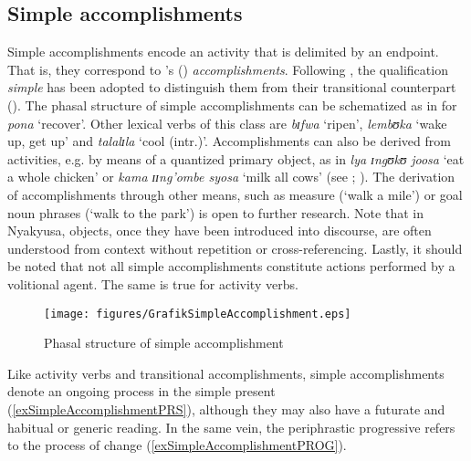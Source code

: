 \subsection{Simple accomplishments}\label{VerbalClassSimpleAccomplishment}
Simple accomplishments encode an activity that is delimited by an endpoint. That is, they correspond to \citeauthor{VendlerZ1957}'s (\citeyear{VendlerZ1957}) \textit{accomplishments}. Following \citet{BotneR2008}, the qualification \textit{simple} has been adopted to distinguish them from their transitional counterpart (). The phasal structure of simple accomplishments can be schematized as in  for \textit{pona} \lq recover'. Other lexical verbs of this class are \textit{bɪfwa} \lq ripen', \textit{lembʊka} \lq wake up, get up' and \textit{talalɪla} \lq cool (intr.)'. Accomplishments can also be derived from activities, e.g. by means of a quantized primary object, as in \textit{lya ɪngʊkʊ joosa} \lq eat a whole chicken' or \textit{kama ɪɪng'ombe syosa} \lq milk all cows' (see \citealt{VerkuylH1972}; \citealt{DowtyD1979}). The derivation of accomplishments through other means, such as measure (\lq walk a mile') or goal noun phrases (\lq walk to the park') is open to further research. Note that in Nyakyusa, objects, once they have been introduced into discourse, are often understood from context without repetition or cross-referencing. Lastly, it should be noted that not all simple accomplishments constitute actions performed by a volitional agent. The same is true for activity verbs.

\begin{figure}[h]
\begin{center}
\texttt{[image: figures/GrafikSimpleAccomplishment.eps]}
\end{center}
\caption{Phasal structure of simple accomplishment}
\label{FigureSimpleAccomplishment}
\end{figure}
Like activity verbs and transitional accomplishments, simple accomplishments denote an ongoing process in the simple present (\ref{exSimpleAccomplishmentPRS}), although they may also have a futurate and habitual or generic reading. In the same vein, the periphrastic progressive refers to the process of change (\ref{exSimpleAccomplishmentPROG}).

